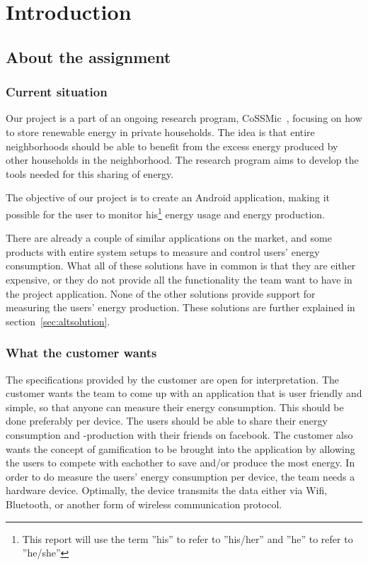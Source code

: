 \chapter{Introduction}

\section{About the assignment}
\subsection{Current situation}
Our project is a part of an ongoing research program, CoSSMic~\cite{cossmic}, focusing on how to store renewable energy in private households. The idea is that entire neighborhoods should be able to benefit from the excess energy produced by other households in the neighborhood. The research program aims to develop the tools needed for this sharing of energy. 

The objective of our project is to create an Android application, making it possible for the user to monitor his\footnote{This report will use the term ''his'' to refer to ''his/her'' and ''he'' to refer to ''he/she''} energy usage and energy production. 

There are already a couple of similar applications on the market, and some products with entire system setups to measure and control users' energy consumption. What all of these solutions have in common is that they are either expensive, or they do not provide all the functionality the team want to have in the project application. None of the other solutions provide support for measuring the users' energy production. These solutions are further explained in section~\ref{sec:altsolution}.

\subsection{What the customer wants}
The specifications provided by the customer are open for interpretation. The customer wants the team to come up with an application that is user friendly and simple, so that anyone can measure their energy consumption. This should be done preferably per device. The users should be able to share their energy consumption and -production with their friends on \gls{facebook}. The customer also wants the concept of \gls{gamification} to be brought into the application by allowing the users to compete with eachother to save and/or produce the most energy. In order to do measure the users' energy consumption per device, the team needs a hardware device. Optimally, the device transmits the data either via Wifi, Bluetooth, or another form of wireless communication protocol. 

